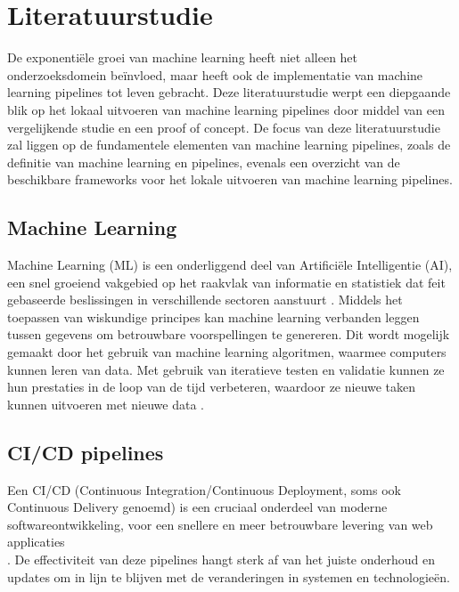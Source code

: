 
\section{Literatuurstudie}%
\label{sec:state-of-the-art}
De exponentiële groei van machine learning heeft niet alleen het onderzoeksdomein beïnvloed, maar heeft ook de implementatie van machine learning pipelines tot leven gebracht.
Deze literatuurstudie werpt een diepgaande blik op het lokaal uitvoeren van machine learning pipelines door middel van een vergelijkende studie en een proof of concept.
De focus van deze literatuurstudie zal liggen op de fundamentele elementen van machine learning pipelines, zoals de definitie van machine learning en pipelines, evenals een overzicht van de beschikbare frameworks voor het lokale uitvoeren van machine learning pipelines.
\subsection{Machine Learning}
Machine Learning (ML) is een onderliggend deel van Artificiële Intelligentie (AI), een snel groeiend vakgebied op het raakvlak van informatie en statistiek dat feit gebaseerde beslissingen in verschillende sectoren aanstuurt \autocite{Jordan2015}.
Middels het toepassen van wiskundige principes kan machine learning verbanden leggen tussen gegevens om betrouwbare voorspellingen te genereren. Dit wordt mogelijk gemaakt door het gebruik van machine learning algoritmen, waarmee computers kunnen leren van data. Met gebruik van iteratieve testen en validatie kunnen ze hun prestaties in de loop van de tijd verbeteren, waardoor ze nieuwe taken kunnen uitvoeren met nieuwe data \autocite{Shaveta2023}.
\subsection{CI/CD pipelines}
Een CI/CD (Continuous Integration/Continuous Deployment, soms ook Continuous Delivery genoemd) is een cruciaal onderdeel van moderne softwareontwikkeling, voor een snellere en meer betrouwbare levering van web applicaties\\ \autocite{Singh2023}.
De effectiviteit van deze pipelines hangt sterk af van het juiste onderhoud en updates om in lijn te blijven met de veranderingen in systemen en technologieën.
